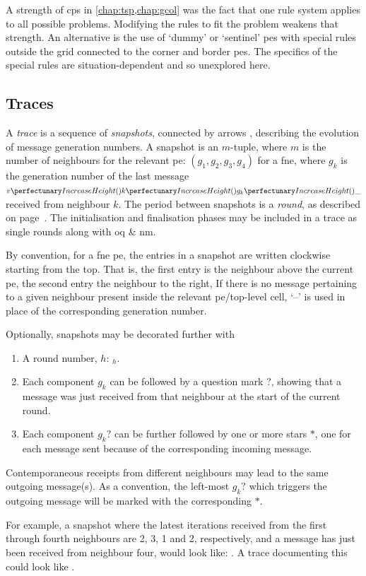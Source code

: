 A strength of \gls{cps} in \cref{chap:tsp,chap:gcol} was the fact that one rule system applies to all possible problems.  Modifying the rules to fit the problem weakens that strength.  An alternative is the use of `dummy' or `sentinel' \glspl{pe} with special rules outside the grid connected to the corner and border \glspl{pe}.  The specifics of the special rules are situation-dependent and so unexplored here.

\subsection{Traces}

A \emph{trace} is a sequence of \emph{snapshots}, connected by arrows \tarr{}, describing the evolution of message generation numbers. A snapshot is an \(m\)-tuple, where \(m\) is the number of neighbours for the relevant \gls{pe}:  \((g_1, g_2, g_3, g_4)\) for a \gls{fne}, where \(g_k\) is the generation number of the last message \(\cpvv{k}{g_k}{\cpdiscard}\) received from neighbour \(k\).  The period between snapshots is a \emph{round}, as described on page~\pageref{pg:nmp:rounds}.  The initialisation and finalisation phases may be included in a trace as single rounds along with \gls{oq} \& \gls{nm}.

By convention, for a \gls{fne} \gls{pe}, the entries in a snapshot are written clockwise starting from the top.  That is, the first entry is the neighbour above the current \gls{pe}, the second entry the neighbour to the right, \etc{}  If there is no message pertaining to a given neighbour present inside the relevant \gls{pe}/top-level cell, `--' is used in place of the corresponding generation number.

Optionally, snapshots may be decorated further with 
{\renewcommand{\theenumi}{\alph{enumi}}
\begin{enumerate}
    \item A round number, \(h\): \(_h\).
    \item Each component \(g_k\) can be followed by a question mark \(?\), showing that a message was just received from that neighbour at the start of the current round.
    \item Each component \(g_k?\) can be further followed by one or more stars \(*\), one for each message sent because of the corresponding incoming message.
\end{enumerate}}

Contemporaneous receipts from different neighbours may lead to the same outgoing message(s).  As a convention, the left-most \(g_k?\) which triggers the outgoing message will be marked with the corresponding \(*\).

For example, a snapshot where the latest iterations received from the first through fourth neighbours are 2, 3, 1 and 2, respectively, and a message has just been received from neighbour four, would look like:  .  A trace documenting this could look like  \tarr{} .